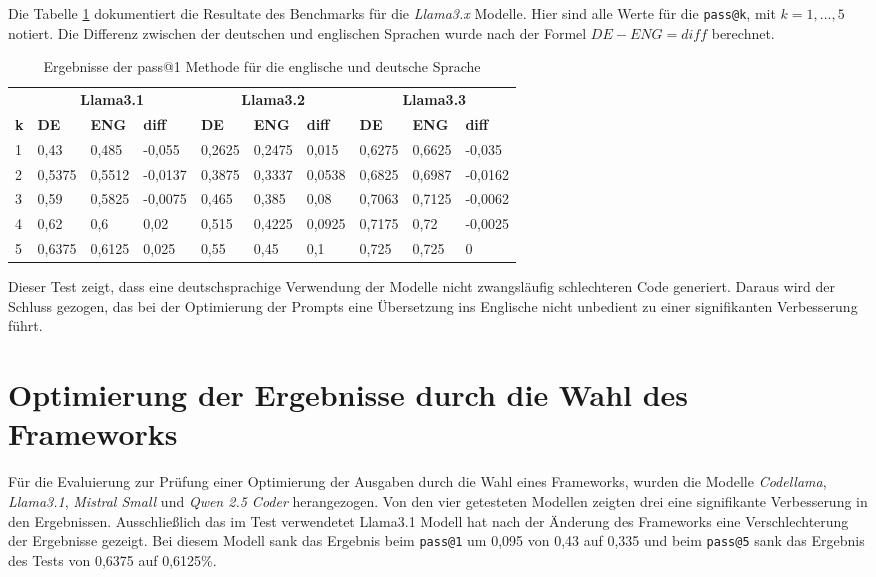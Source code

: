 Die Tabelle \ref{tab:prompt_results_llama_x_by_lang} dokumentiert die Resultate des Benchmarks für die \textit{Llama3.x} Modelle. Hier sind alle Werte für die \texttt{pass@k}, mit $k=1,...,5$ notiert. Die Differenz zwischen der deutschen und englischen Sprachen wurde nach der Formel $DE - ENG = diff$ berechnet.\vspace{0.2cm}

\begin{table}[!ht]
	\begin{tabular}{|l|lll|lll|lll|}
		\hline
		& \multicolumn{3}{c|}{\textbf{Llama3.1}} & \multicolumn{3}{c|}{\textbf{Llama3.2}} & \multicolumn{3}{c|}{\textbf{Llama3.3}} \\
		\textbf{k} & \textbf{DE} & \textbf{ENG} & \textbf{diff} & \textbf{DE} & \textbf{ENG} & \textbf{diff} & \textbf{DE} & \textbf{ENG} & \textbf{diff} \\
		\hline
		1 & 0,43 & 0,485 & -0,055     & 0,2625 & 0,2475 & 0,015  & 0,6275 & 0,6625 & -0,035 \\
		2 & 0,5375 & 0,5512 & -0,0137 & 0,3875 & 0,3337 & 0,0538 & 0,6825 & 0,6987 & -0,0162 \\
		3 & 0,59 & 0,5825 & -0,0075   & 0,465 & 0,385 & 0,08     & 0,7063 & 0,7125 & -0,0062 \\
		4 & 0,62 & 0,6 & 0,02         & 0,515 & 0,4225 & 0,0925  & 0,7175 & 0,72 & -0,0025 \\
		5 & 0,6375 & 0,6125 & 0,025   & 0,55 & 0,45 & 0,1        & 0,725 & 0,725 & 0 \\
		\hline
		\hline
	\end{tabular}
	\centering
	\label{tab:prompt_results_llama_x_by_lang}
	\caption{Ergebnisse der pass@1 Methode für die englische und deutsche Sprache}
\end{table}

Dieser Test zeigt, dass eine deutschsprachige Verwendung der Modelle nicht zwangsläufig schlechteren Code generiert. Daraus wird der Schluss gezogen, das bei der Optimierung der Prompts eine Übersetzung ins Englische nicht unbedient zu einer signifikanten Verbesserung führt.



\section{Optimierung der Ergebnisse durch die Wahl des Frameworks}
Für die Evaluierung zur Prüfung einer Optimierung der Ausgaben durch die Wahl eines Frameworks, wurden die Modelle \textit{Codellama}, \textit{Llama3.1}, \textit{Mistral Small} und \textit{Qwen 2.5 Coder} herangezogen. Von den vier getesteten Modellen zeigten drei eine signifikante Verbesserung in den Ergebnissen. Ausschließlich das im Test verwendetet Llama3.1 Modell hat nach der Änderung des Frameworks eine Verschlechterung der Ergebnisse gezeigt. Bei diesem Modell sank das Ergebnis beim \texttt{pass@1} um 0,095 von 0,43 auf 0,335 und beim \texttt{pass@5} sank das Ergebnis des Tests von 0,6375 auf 0,6125\%.\vspace{0.2cm}


